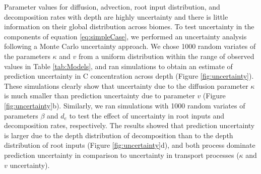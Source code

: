 \documentclass[11pt, oneside, a4paper]{article}   	%
\begin{document}
Parameter values for diffusion, advection, root input distribution, and decomposition rates with depth are highly uncertainty and there is little information on their global distribution across biomes. To test uncertainty in the components of equation \ref{eq:simpleCase}, we performed an uncertainty analysis following a Monte Carlo uncertainty approach. We chose 1000 random variates of the parameters $\kappa$ and $v$ from a uniform distribution within the range of observed values in Table \ref{tab:Models}, and ran simulations to obtain an estimate of prediction uncertainty in C concentration across depth (Figure \ref{fig:uncertainty}). These simulations clearly show that uncertainty due to the diffusion parameter $\kappa$ is much smaller than prediction uncertainty due to parameter $v$ (Figure \ref{fig:uncertainty}b). Similarly, we ran simulations with 1000 random variates of parameters $\beta$ and $d_e$ to test the effect of uncertainty in root inputs and decomposition rates, respectively. The results showed that prediction uncertainty is larger due to the depth distribution of decomposition than to the depth distribution of root inputs (Figure \ref{fig:uncertainty}d), and both process dominate prediction uncertainty in comparison to uncertainty in transport processes ($\kappa$ and $v$ uncertainty).
\end{document}
